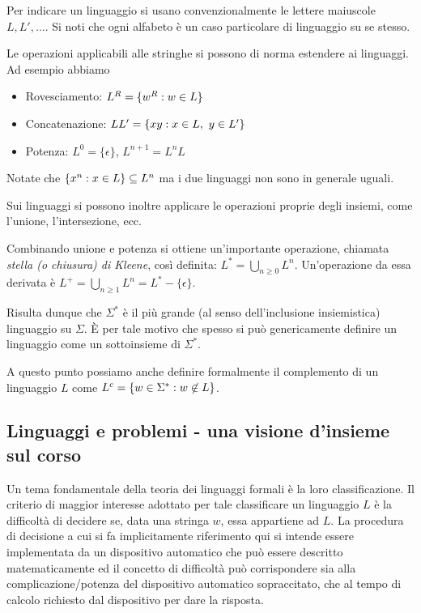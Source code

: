 \documentclass[runningheads,a4paper]{llncs}
\begin{document}
Per indicare un linguaggio si usano convenzionalmente le lettere maiuscole $L,L',\ldots$. Si noti che ogni alfabeto \`{e} un caso particolare di linguaggio su se stesso.

Le operazioni applicabili alle stringhe si possono di norma estendere ai linguaggi. Ad esempio abbiamo 
\begin{itemize}
\item Rovesciamento: $L^R = \{w^R : w \in L\}$
\item Concatenazione: $LL' = \{xy : x \in L,\ y \in L'\}$
\item Potenza: $L^0 = \{\epsilon\}$, \qquad $L^{n+1} = L^nL$
\end{itemize}
Notate che $\{x^n : x \in L\} \subseteq L^n$ ma i due linguaggi non sono in generale uguali.

Sui linguaggi si possono inoltre applicare le operazioni proprie degli insiemi, come l'unione, l'intersezione, ecc.

Combinando unione e potenza si ottiene un'importante operazione, chiamata \emph{stella (o chiusura) di Kleene}, cos\`{i} definita: $L^* = \bigcup_{n\geq 0} L^n$. Un'operazione da essa derivata \`{e} $L^+ = \bigcup_{n\geq 1} L^n = L^*- \{\epsilon\}$.

Risulta dunque che $\Sigma^*$ \`{e} il pi\`{u} grande (al senso dell'inclusione insiemistica) linguaggio su $\Sigma$. \`{E} per tale motivo che spesso si pu\`{o} genericamente definire un linguaggio come un sottoinsieme di $\Sigma^*$.

A questo punto possiamo anche definire formalmente il complemento di un linguaggio $L$ come $L^c = \{w \in \Sigma^* : w \not\in L \}$.

\subsection{Linguaggi e problemi - una visione d'insieme sul corso}

Un tema fondamentale della teoria dei linguaggi formali \`{e} la loro classificazione. Il criterio  di maggior interesse adottato per tale classificare un linguaggio $L$ \`{e} la difficolt\`{a} di decidere se, data una stringa $w$, essa appartiene ad $L$. La procedura di decisione a cui si fa implicitamente riferimento qui si intende essere implementata da un dispositivo automatico che pu\`{o} essere descritto matematicamente ed il concetto di difficolt\`{a} pu\`{o} corrispondere sia alla complicazione/potenza del dispositivo automatico sopraccitato, che al tempo di calcolo richiesto dal dispositivo per dare la risposta.
\end{document}
